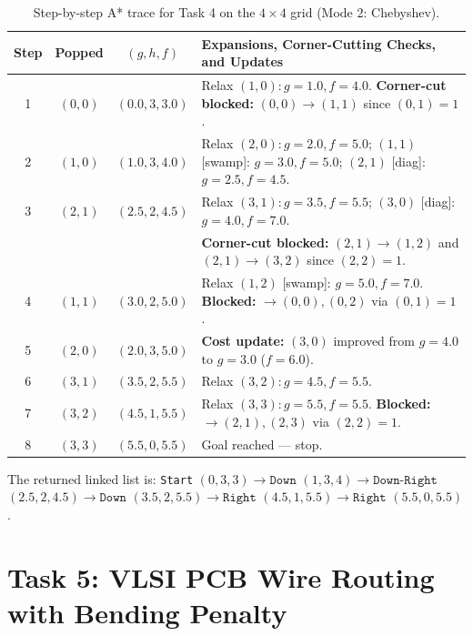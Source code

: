 \documentclass[11pt,a4paper]{article}
\begin{document}
\begin{table}[h]
\centering
\caption{Step-by-step A* trace for Task 4 on the $4\times 4$ grid (Mode 2: Chebyshev).}
\label{tab:task4-trace}
\begin{tabular}{@{}c c c l@{}}
\toprule
Step & Popped & $(g, h, f)$ & Expansions, Corner-Cutting Checks, and Updates \\
\midrule
1 & $(0,0)$ & $(0.0, 3, 3.0)$ & Relax $(1,0): g=1.0, f=4.0$. \textbf{Corner-cut blocked:} $(0,0)\to(1,1)$ since $(0,1)=1$. \\
2 & $(1,0)$ & $(1.0, 3, 4.0)$ & Relax $(2,0): g=2.0, f=5.0$; $(1,1)$ [swamp]: $g=3.0, f=5.0$; $(2,1)$ [diag]: $g=2.5, f=4.5$. \\
3 & $(2,1)$ & $(2.5, 2, 4.5)$ & Relax $(3,1): g=3.5, f=5.5$; $(3,0)$ [diag]: $g=4.0, f=7.0$. \\
  &         &                 & \textbf{Corner-cut blocked:} $(2,1)\to(1,2)$ and $(2,1)\to(3,2)$ since $(2,2)=1$. \\
4 & $(1,1)$ & $(3.0, 2, 5.0)$ & Relax $(1,2)$ [swamp]: $g=5.0, f=7.0$. \textbf{Blocked:} $\to(0,0), (0,2)$ via $(0,1)=1$. \\
5 & $(2,0)$ & $(2.0, 3, 5.0)$ & \textbf{Cost update:} $(3,0)$ improved from $g=4.0$ to $g=3.0$ ($f=6.0$). \\
6 & $(3,1)$ & $(3.5, 2, 5.5)$ & Relax $(3,2): g=4.5, f=5.5$. \\
7 & $(3,2)$ & $(4.5, 1, 5.5)$ & Relax $(3,3): g=5.5, f=5.5$. \textbf{Blocked:} $\to(2,1), (2,3)$ via $(2,2)=1$. \\
8 & $(3,3)$ & $(5.5, 0, 5.5)$ & Goal reached --- stop. \\
\bottomrule
\end{tabular}
\end{table}

The returned linked list is:
\texttt{Start} $(0,3,3) \to \texttt{Down}$ $(1,3,4) \to \texttt{Down-Right}$ $(2.5,2,4.5) \to \texttt{Down}$ $(3.5,2,5.5) \to \texttt{Right}$ $(4.5,1,5.5) \to \texttt{Right}$ $(5.5,0,5.5)$.

\section{Task 5: VLSI PCB Wire Routing with Bending Penalty}
\end{document}
